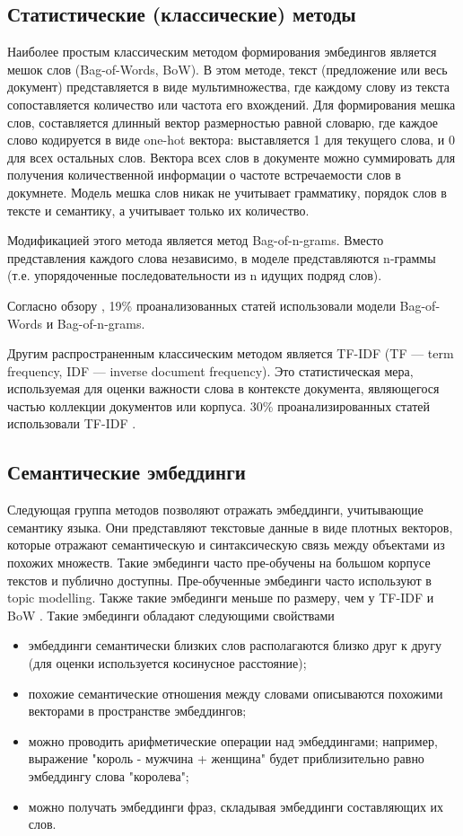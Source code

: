 \subsection{Статистические (классические) методы}

Наиболее простым классическим методом формирования эмбедингов является мешок слов (Bag-of-Words, BoW). В этом методе, текст (предложение или весь документ) представляется в виде мультимножества, где каждому слову из текста сопоставляется количество или частота его вхождений. Для формирования мешка слов, составляется длинный вектор размерностью равной словарю, где каждое слово кодируется в виде one-hot вектора: выставляется 1 для текущего слова, и 0 для всех остальных слов. Вектора всех слов в документе можно суммировать для получения количественной информации о частоте встречаемости слов в докумнете. Модель мешка слов никак не учитывает грамматику, порядок слов в тексте и семантику, а учитывает только их количество.

Модификацией этого метода является метод Bag-of-n-grams. Вместо представления каждого слова независимо, в моделе представляются n-граммы (т.е. упорядоченные последовательности из n идущих подряд слов).

Согласно обзору \cite{no-patterns}, 19\% проанализованных статей использовали модели Bag-of-Words и Bag-of-n-grams.

Другим распространенным классическим методом является TF-IDF (TF — term frequency, IDF — inverse document frequency). Это статистическая мера, используемая для оценки важности слова в контексте документа, являющегося частью коллекции документов или корпуса. 30\% проанализированных статей использовали TF-IDF \cite{no-patterns}.

\subsection{Семантические эмбеддинги}

Следующая группа методов позволяют отражать эмбеддинги, учитывающие семантику языка. Они представляют текстовые данные в виде плотных векторов, которые отражают семантическую и синтаксическую связь между  объектами из похожих множеств. Такие эмбединги часто пре-обучены на большом корпусе текстов и публично доступны. Пре-обученные эмбединги часто используют в  topic modelling. Также такие эмбединги меньше по размеру, чем у TF-IDF и BoW \cite{no-patterns}. Такие эмбединги обладают следующими свойствами
\begin{itemize}
    \item эмбеддинги семантически близких слов располагаются близко друг к другу (для оценки используется косинусное расстояние);
    \item похожие семантические отношения между словами описываются похожими векторами в пространстве эмбеддингов;
    \item можно проводить арифметические операции над эмбеддингами; например, выражение "король - мужчина + женщина" будет приблизительно равно эмбеддингу слова "королева";
    \item можно получать эмбеддинги фраз, складывая эмбеддинги составляющих их слов.
\end{itemize}

